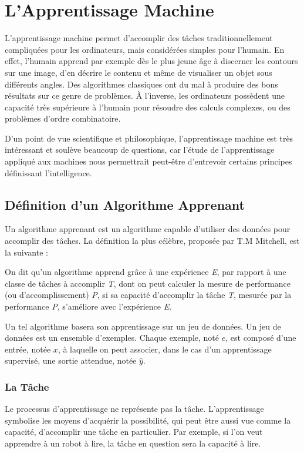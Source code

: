 \documentclass[a4paper, 11pt]{report}
\begin{document}
\chapter{L'Apprentissage Machine}
L'apprentissage machine permet d'accomplir des tâches traditionnellement compliquées pour les ordinateurs, mais considérées simples pour l'humain.
En effet, l'humain apprend par exemple dès le plus jeune âge à discerner les contours sur une image, d'en décrire le contenu et même de visualiser un objet sous différents angles. Des algorithmes classiques ont du mal à produire des bons résultats sur ce genre de problèmes.
À l'inverse, les ordinateurs possèdent une capacité très supérieure à l'humain pour résoudre des calculs complexes, ou des problèmes d'ordre combinatoire.

D'un point de vue scientifique et philosophique, l'apprentissage machine est très intéressant et soulève beaucoup de questions, car l'étude de l'apprentissage appliqué aux machines nous permettrait peut-être d'entrevoir certains principes définissant l'intelligence.
\section{Définition d'un Algorithme Apprenant}
Un algorithme apprenant est un algorithme capable d'utiliser des données pour accomplir des tâches. La définition la plus célèbre, proposée par T.M Mitchell, est la suivante :
\begin{displayquote}
	On dit qu'un algorithme apprend grâce à une expérience \emph{E}, par rapport à une classe de tâches à accomplir \emph{T}, dont on peut calculer la mesure de performance (ou d'accomplissement) \emph{P}, si sa capacité d'accomplir la tâche \emph{T}, mesurée par la performance \emph{P}, s'améliore avec l'expérience \emph{E}.
\end{displayquote}

Un tel algorithme basera son apprentissage sur un jeu de données. Un jeu de données est un ensemble d'exemples.
Chaque exemple, noté $e$, est composé d'une entrée, notée $x$, à laquelle on peut associer, dans le cas d'un apprentissage supervisé, une sortie attendue, notée $\hat{y}$.
\subsection{La Tâche}
Le processus d'apprentissage ne représente pas la tâche. L'apprentissage symbolise les moyens d'acquérir la possibilité, qui peut être aussi vue comme la capacité, d'accomplir une tâche en particulier.
Par exemple, si l'on veut apprendre à un robot à lire, la tâche en question sera la capacité à lire.
\end{document}
